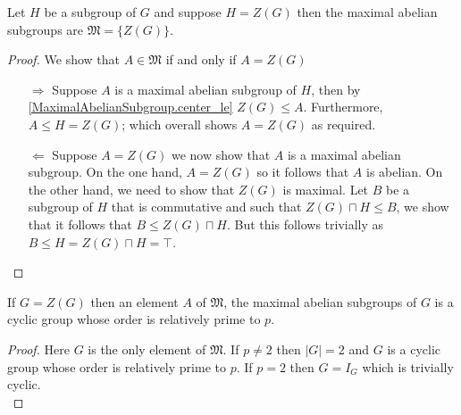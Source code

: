
\begin{lemma}
\label{MaximalAbelianSubgroup.singleton_of_cen_eq_G}
\leanok
Let $H$ be a subgroup of $G$ and suppose $H = Z(G)$ then the maximal abelian subgroups are $\mathfrak{M} = \{Z(G)\}$.
\end{lemma}
\begin{proof}
  \leanok
  We show that $A \in \mathfrak{M}$ if and only if $A = Z(G)$
  \begin{itemize}
    \item[$\Rightarrow$] Suppose $A$ is a maximal abelian subgroup of $H$, then by \ref{MaximalAbelianSubgroup.center_le} $Z(G) \le A$. Furthermore, $A \le H = Z(G)$; which overall shows $A = Z(G)$ as required.
    \item[$\Leftarrow$] Suppose $A = Z(G)$ we now show that $A$ is a maximal abelian subgroup. 
      On the one hand, $A = Z(G)$ so it follows that $A$ is abelian.
      On the other hand, we need to show that $Z(G)$ is maximal. Let $B$ be a subgroup of $H$ that is commutative and such that $Z(G) \sqcap H \le B$, we show that it follows that $B \le Z(G) \sqcap H$. But this follows trivially as 
      $B \leq H = Z(G) \sqcap H = \top$.
  \end{itemize}
\end{proof}



\begin{lemma}
  \label{MaximalAbelianSubgroup.IsCyclic_and_card_Coprime_CharP_of_center_eq}
  \leanok
  If $G = Z(G)$ then an element $A$ of $\mathfrak{M}$, the maximal abelian subgroups of $G$ is a cyclic group whose order is relatively prime to $p$.
\end{lemma}
\begin{proof}
\leanok
  Here $G$ is the only element of $\mathfrak{M}$. If $p \neq 2$ then $|G|=2$ and $G$ is a cyclic group whose order is relatively prime to $p$. If $p=2$ then $G = I_G$ which is trivially cyclic. \\
\end{proof}


